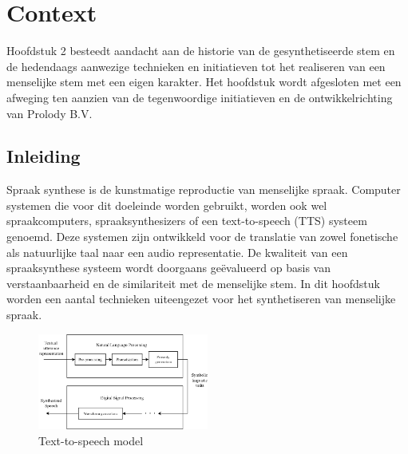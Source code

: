 \chapter{Context}

\begin{center}
  \begin{minipage}{0.5\textwidth}
    \begin{small}
      Hoofdstuk 2 besteedt aandacht aan de historie van de gesynthetiseerde stem en de hedendaags aanwezige technieken en initiatieven tot het realiseren van een menselijke stem met een eigen karakter. Het hoofdstuk wordt afgesloten met een afweging ten aanzien van de tegenwoordige initiatieven en de ontwikkelrichting van Prolody B.V.
    \end{small}
  \end{minipage}
  \vspace{0.5cm}
\end{center}

\section{Inleiding}

Spraak synthese is de kunstmatige reproductie van menselijke spraak. Computer systemen die voor dit doeleinde worden gebruikt, worden ook wel spraakcomputers, spraaksynthesizers of een text-to-speech (TTS) systeem genoemd. Deze systemen zijn ontwikkeld voor de translatie van zowel fonetische als natuurlijke taal naar een audio representatie. De kwaliteit van een spraaksynthese systeem wordt doorgaans geëvalueerd op basis van verstaanbaarheid en de similariteit met de menselijke stem. In dit hoofdstuk worden een aantal technieken uiteengezet voor het synthetiseren van menselijke spraak.

\begin{figure}[]
    \centering
    \includegraphics[width=0.5\textwidth]{figures/tts_system.png}
    \caption{Text-to-speech model \cite{speect}}
    \label{fig:tts}
\end{figure}

